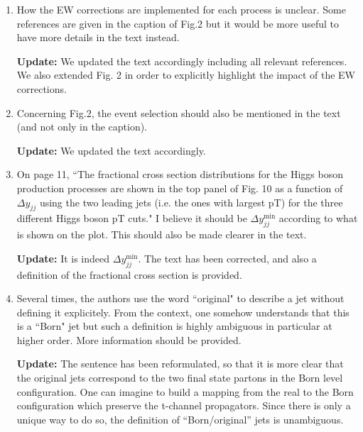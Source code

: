 \documentclass[12pt]{article}
\begin{document}
\begin{enumerate}
\item How the EW corrections are implemented for each process is unclear. Some references are given in the caption of Fig.2 but it would be more useful to have more details in the text instead.

{\bf Update:} We updated the text accordingly including all relevant references. We also extended Fig. 2 in order to explicitly highlight the impact of the EW corrections.

\item Concerning Fig.2, the event selection should also be mentioned in the text (and not only in the caption).

{\bf Update:} We updated the text accordingly.

\item On page 11, ``The fractional cross section distributions for the Higgs boson production processes are shown in the top panel of Fig. 10 as a function of $\Delta y_{jj}$ using the two leading jets (i.e. the ones with largest pT) for the three different Higgs boson pT cuts." I believe it should be $\Delta y_{jj}^{\text{min}}$ according to what is shown on the plot. This should also be made clearer in the text.

{\bf Update:} It is indeed $\Delta y_{jj}^{\text{min}}$. The text has been corrected, and also a definition of the fractional cross section is provided.

\item Several times, the authors use the word ``original" to describe a jet without defining it explicitely. From the context, one somehow understands that this is a ``Born" jet but such a definition is highly ambiguous in particular at higher order. More information should be provided.

{\bf Update:} The sentence has been reformulated, so that it is more clear that  the original jets correspond to the two final state partons in the Born level configuration. One can imagine to build a mapping from the real to the Born configuration which preserve the t-channel propagators. Since there is only a unique way to do so, the definition of ``Born/original'' jets is unambiguous.

\end{enumerate}
\end{document}

